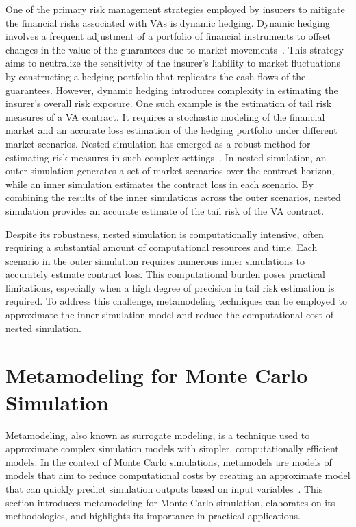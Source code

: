 One of the primary risk management strategies employed by insurers to mitigate the financial risks associated with VAs is dynamic hedging. 
Dynamic hedging involves a frequent adjustment of a portfolio of financial instruments to offset changes in the value of the guarantees due to market movements~\citep{hull2016options}. 
This strategy aims to neutralize the sensitivity of the insurer's liability to market fluctuations by constructing a hedging portfolio that replicates the cash flows of the guarantees.
However, dynamic hedging introduces complexity in estimating the insurer's overall risk exposure.
One such example is the estimation of tail risk measures of a VA contract.
It requires a stochastic modeling of the financial market and an accurate loss estimation of the hedging portfolio under different market scenarios.
Nested simulation has emerged as a robust method for estimating risk measures in such complex settings~\citep{gordy2010nested}.
In nested simulation, an outer simulation generates a set of market scenarios over the contract horizon, while an inner simulation estimates the contract loss in each scenario.
By combining the results of the inner simulations across the outer scenarios, nested simulation provides an accurate estimate of the tail risk of the VA contract.

Despite its robustness, nested simulation is computationally intensive, often requiring a substantial amount of computational resources and time. 
Each scenario in the outer simulation requires numerous inner simulations to accurately estmate contract loss. 
This computational burden poses practical limitations, especially when a high degree of precision in tail risk estimation is required.
To address this challenge, metamodeling techniques can be employed to approximate the inner simulation model and reduce the computational cost of nested simulation.

\section{Metamodeling for Monte Carlo Simulation}

Metamodeling, also known as surrogate modeling, is a technique used to approximate complex simulation models with simpler, computationally efficient models. 
In the context of Monte Carlo simulations, metamodels are models of models that aim to reduce computational costs by creating an approximate model that can quickly predict simulation outputs based on input variables~\citep{kleijnen2018design}. 
This section introduces metamodeling for Monte Carlo simulation, elaborates on its methodologies, and highlights its importance in practical applications.

